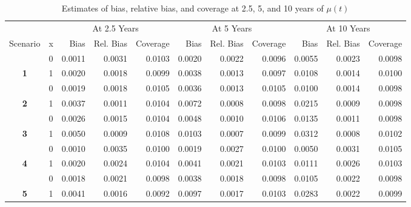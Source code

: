 \begin{table}

\caption{Estimates of bias, relative bias, and coverage at 2.5, 5, and 10 years of $\mu(t)$}
\centering
\begin{tabular}[t]{>{}ccrrrrrrrrr}
\toprule
\multicolumn{2}{c}{ } & \multicolumn{3}{c}{At 2.5 Years} & \multicolumn{3}{c}{At 5 Years} & \multicolumn{3}{c}{At 10 Years} \\
\cmidrule(l{3pt}r{3pt}){3-5} \cmidrule(l{3pt}r{3pt}){6-8} \cmidrule(l{3pt}r{3pt}){9-11}
Scenario & x & Bias & Rel. Bias & Coverage & Bias & Rel. Bias & Coverage & Bias & Rel. Bias & Coverage\\
\midrule
 & 0 & 0.0011 & 0.0031 & 0.0103 & 0.0020 & 0.0022 & 0.0096 & 0.0055 & 0.0023 & 0.0098\\

\multirow[t]{-2}{*}{\centering\arraybackslash \textbf{1}} & 1 & 0.0020 & 0.0018 & 0.0099 & 0.0038 & 0.0013 & 0.0097 & 0.0108 & 0.0014 & 0.0100\\

 & 0 & 0.0019 & 0.0018 & 0.0105 & 0.0036 & 0.0013 & 0.0105 & 0.0100 & 0.0014 & 0.0098\\

\multirow[t]{-2}{*}{\centering\arraybackslash \textbf{2}} & 1 & 0.0037 & 0.0011 & 0.0104 & 0.0072 & 0.0008 & 0.0098 & 0.0215 & 0.0009 & 0.0098\\

 & 0 & 0.0026 & 0.0015 & 0.0104 & 0.0048 & 0.0010 & 0.0106 & 0.0135 & 0.0011 & 0.0098\\

\multirow[t]{-2}{*}{\centering\arraybackslash \textbf{3}} & 1 & 0.0050 & 0.0009 & 0.0108 & 0.0103 & 0.0007 & 0.0099 & 0.0312 & 0.0008 & 0.0102\\

\rule{0pt}{4ex}
 & 0 & 0.0010 & 0.0035 & 0.0100 & 0.0019 & 0.0027 & 0.0100 & 0.0050 & 0.0031 & 0.0105\\

\multirow[t]{-2}{*}{\centering\arraybackslash \textbf{4}} & 1 & 0.0020 & 0.0024 & 0.0104 & 0.0041 & 0.0021 & 0.0103 & 0.0111 & 0.0026 & 0.0103\\

 & 0 & 0.0018 & 0.0021 & 0.0098 & 0.0038 & 0.0018 & 0.0098 & 0.0105 & 0.0022 & 0.0098\\

\multirow[t]{-2}{*}{\centering\arraybackslash \textbf{5}} & 1 & 0.0041 & 0.0016 & 0.0092 & 0.0097 & 0.0017 & 0.0103 & 0.0283 & 0.0022 & 0.0099\\


\end{tabular}
\end{table}
